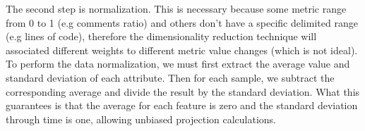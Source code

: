 The second step is normalization. This is necessary because some metric range from 0 to 1 (e.g comments ratio) and others don't have a specific delimited range (e.g lines of code), therefore the dimensionality reduction technique will associated different weights to different metric value changes (which is not ideal). To perform the data normalization, we must first extract the average value and standard deviation of each attribute. Then for each sample, we subtract the corresponding average and divide the result by the standard deviation. What this guarantees is that the average for each feature is zero and the standard deviation through time is one, allowing unbiased projection calculations. 
